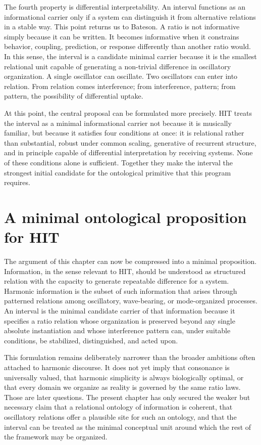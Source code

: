 The fourth property is differential interpretability. An interval functions as an informational carrier only if a system can distinguish it from alternative relations in a stable way. This point returns us to Bateson. A ratio is not informative simply because it can be written. It becomes informative when it constrains behavior, coupling, prediction, or response differently than another ratio would. In this sense, the interval is a candidate minimal carrier because it is the smallest relational unit capable of generating a non-trivial difference in oscillatory organization. A single oscillator can oscillate. Two oscillators can enter into relation. From relation comes interference; from interference, pattern; from pattern, the possibility of differential uptake.

At this point, the central proposal can be formulated more precisely. HIT treats the interval as a minimal informational carrier not because it is musically familiar, but because it satisfies four conditions at once: it is relational rather than substantial, robust under common scaling, generative of recurrent structure, and in principle capable of differential interpretation by receiving systems. None of these conditions alone is sufficient. Together they make the interval the strongest initial candidate for the ontological primitive that this program requires.


\section{A minimal ontological proposition for HIT}


The argument of this chapter can now be compressed into a minimal proposition. Information, in the sense relevant to HIT, should be understood as structured relation with the capacity to generate repeatable difference for a system. Harmonic information is the subset of such information that arises through patterned relations among oscillatory, wave-bearing, or mode-organized processes. An interval is the minimal candidate carrier of that information because it specifies a ratio relation whose organization is preserved beyond any single absolute instantiation and whose interference pattern can, under suitable conditions, be stabilized, distinguished, and acted upon.

This formulation remains deliberately narrower than the broader ambitions often attached to harmonic discourse. It does not yet imply that consonance is universally valued, that harmonic simplicity is always biologically optimal, or that every domain we organize as reality is governed by the same ratio laws. Those are later questions. The present chapter has only secured the weaker but necessary claim that a relational ontology of information is coherent, that oscillatory relations offer a plausible site for such an ontology, and that the interval can be treated as the minimal conceptual unit around which the rest of the framework may be organized.

